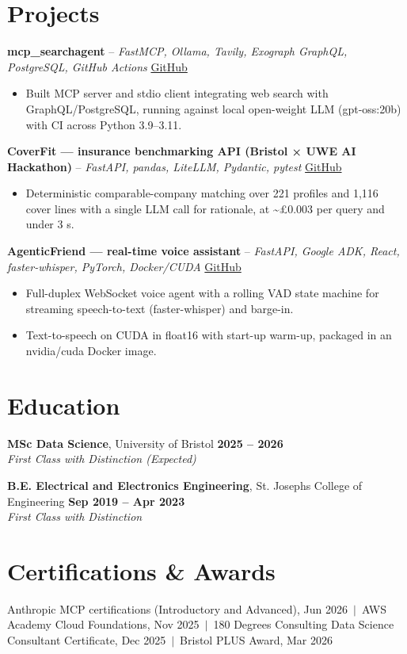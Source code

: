 \documentclass[a4paper,11pt]{article}
\begin{document}
\section{Projects}
\noindent\textbf{mcp\_searchagent} -- \textit{FastMCP, Ollama, Tavily, Exograph GraphQL, PostgreSQL, GitHub Actions} \hfill \href{https://github.com/Thiruvel-AP/mcp_searchagent}{GitHub}
\begin{itemize}
  \item Built MCP server and stdio client integrating web search with GraphQL/PostgreSQL, running against local open-weight LLM (gpt-oss:20b) with CI across Python 3.9–3.11.
\end{itemize}
\vspace{3pt}
\noindent\textbf{CoverFit — insurance benchmarking API (Bristol × UWE AI Hackathon)} -- \textit{FastAPI, pandas, LiteLLM, Pydantic, pytest} \hfill \href{https://github.com/Thiruvel-AP/AIHackathon-Phoenix}{GitHub}
\begin{itemize}
  \item Deterministic comparable-company matching over 221 profiles and 1,116 cover lines with a single LLM call for rationale, at \textasciitilde{}£0.003 per query and under 3 s.
\end{itemize}
\vspace{3pt}
\noindent\textbf{AgenticFriend — real-time voice assistant} -- \textit{FastAPI, Google ADK, React, faster-whisper, PyTorch, Docker/CUDA} \hfill \href{https://github.com/Thiruvel-AP/adk_multi-agent}{GitHub}
\begin{itemize}
  \item Full-duplex WebSocket voice agent with a rolling VAD state machine for streaming speech-to-text (faster-whisper) and barge-in.
  \item Text-to-speech on CUDA in float16 with start-up warm-up, packaged in an nvidia/cuda Docker image.
\end{itemize}

\section{Education}
\textbf{MSc Data Science}, University of Bristol \hfill \textbf{2025 – 2026}\\ \textit{First Class with Distinction (Expected)}\par
\vspace{3pt}
\textbf{B.E. Electrical and Electronics Engineering}, St. Joseph\textquotesingle{}s College of Engineering \hfill \textbf{Sep 2019 – Apr 2023}\\ \textit{First Class with Distinction}\par

\section{Certifications \& Awards}
Anthropic MCP certifications (Introductory and Advanced), Jun 2026 \,$|$\, AWS Academy Cloud Foundations, Nov 2025 \,$|$\, 180 Degrees Consulting Data Science Consultant Certificate, Dec 2025 \,$|$\, Bristol PLUS Award, Mar 2026
\end{document}
